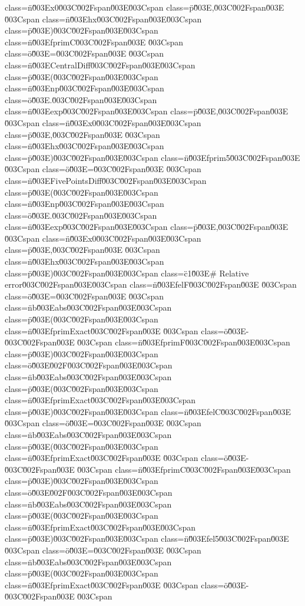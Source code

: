 class=\"n\"\u003Ex0\u003C\u002Fspan\u003E\u003Cspan class=\"p\"\u003E,\u003C\u002Fspan\u003E \u003Cspan class=\"n\"\u003Ehx\u003C\u002Fspan\u003E\u003Cspan class=\"p\"\u003E)\u003C\u002Fspan\u003E\n\u003Cspan class=\"n\"\u003EfprimC\u003C\u002Fspan\u003E \u003Cspan class=\"o\"\u003E=\u003C\u002Fspan\u003E \u003Cspan class=\"n\"\u003ECentralDiff\u003C\u002Fspan\u003E\u003Cspan class=\"p\"\u003E(\u003C\u002Fspan\u003E\u003Cspan class=\"n\"\u003Enp\u003C\u002Fspan\u003E\u003Cspan class=\"o\"\u003E.\u003C\u002Fspan\u003E\u003Cspan class=\"n\"\u003Eexp\u003C\u002Fspan\u003E\u003Cspan class=\"p\"\u003E,\u003C\u002Fspan\u003E \u003Cspan class=\"n\"\u003Ex0\u003C\u002Fspan\u003E\u003Cspan class=\"p\"\u003E,\u003C\u002Fspan\u003E \u003Cspan class=\"n\"\u003Ehx\u003C\u002Fspan\u003E\u003Cspan class=\"p\"\u003E)\u003C\u002Fspan\u003E\n\u003Cspan class=\"n\"\u003Efprim5\u003C\u002Fspan\u003E \u003Cspan class=\"o\"\u003E=\u003C\u002Fspan\u003E \u003Cspan class=\"n\"\u003EFivePointsDiff\u003C\u002Fspan\u003E\u003Cspan class=\"p\"\u003E(\u003C\u002Fspan\u003E\u003Cspan class=\"n\"\u003Enp\u003C\u002Fspan\u003E\u003Cspan class=\"o\"\u003E.\u003C\u002Fspan\u003E\u003Cspan class=\"n\"\u003Eexp\u003C\u002Fspan\u003E\u003Cspan class=\"p\"\u003E,\u003C\u002Fspan\u003E \u003Cspan class=\"n\"\u003Ex0\u003C\u002Fspan\u003E\u003Cspan class=\"p\"\u003E,\u003C\u002Fspan\u003E \u003Cspan class=\"n\"\u003Ehx\u003C\u002Fspan\u003E\u003Cspan class=\"p\"\u003E)\u003C\u002Fspan\u003E\n\n\u003Cspan class=\"c1\"\u003E# Relative error\u003C\u002Fspan\u003E\n\u003Cspan class=\"n\"\u003EfelF\u003C\u002Fspan\u003E \u003Cspan class=\"o\"\u003E=\u003C\u002Fspan\u003E \u003Cspan class=\"nb\"\u003Eabs\u003C\u002Fspan\u003E\u003Cspan class=\"p\"\u003E(\u003C\u002Fspan\u003E\u003Cspan class=\"n\"\u003EfprimExact\u003C\u002Fspan\u003E \u003Cspan class=\"o\"\u003E-\u003C\u002Fspan\u003E \u003Cspan class=\"n\"\u003EfprimF\u003C\u002Fspan\u003E\u003Cspan class=\"p\"\u003E)\u003C\u002Fspan\u003E\u003Cspan class=\"o\"\u003E\u002F\u003C\u002Fspan\u003E\u003Cspan class=\"nb\"\u003Eabs\u003C\u002Fspan\u003E\u003Cspan class=\"p\"\u003E(\u003C\u002Fspan\u003E\u003Cspan class=\"n\"\u003EfprimExact\u003C\u002Fspan\u003E\u003Cspan class=\"p\"\u003E)\u003C\u002Fspan\u003E\n\u003Cspan class=\"n\"\u003EfelC\u003C\u002Fspan\u003E \u003Cspan class=\"o\"\u003E=\u003C\u002Fspan\u003E \u003Cspan class=\"nb\"\u003Eabs\u003C\u002Fspan\u003E\u003Cspan class=\"p\"\u003E(\u003C\u002Fspan\u003E\u003Cspan class=\"n\"\u003EfprimExact\u003C\u002Fspan\u003E \u003Cspan class=\"o\"\u003E-\u003C\u002Fspan\u003E \u003Cspan class=\"n\"\u003EfprimC\u003C\u002Fspan\u003E\u003Cspan class=\"p\"\u003E)\u003C\u002Fspan\u003E\u003Cspan class=\"o\"\u003E\u002F\u003C\u002Fspan\u003E\u003Cspan class=\"nb\"\u003Eabs\u003C\u002Fspan\u003E\u003Cspan class=\"p\"\u003E(\u003C\u002Fspan\u003E\u003Cspan class=\"n\"\u003EfprimExact\u003C\u002Fspan\u003E\u003Cspan class=\"p\"\u003E)\u003C\u002Fspan\u003E\n\u003Cspan class=\"n\"\u003Efel5\u003C\u002Fspan\u003E \u003Cspan class=\"o\"\u003E=\u003C\u002Fspan\u003E \u003Cspan class=\"nb\"\u003Eabs\u003C\u002Fspan\u003E\u003Cspan class=\"p\"\u003E(\u003C\u002Fspan\u003E\u003Cspan class=\"n\"\u003EfprimExact\u003C\u002Fspan\u003E \u003Cspan class=\"o\"\u003E-\u003C\u002Fspan\u003E \u003Cspan 
